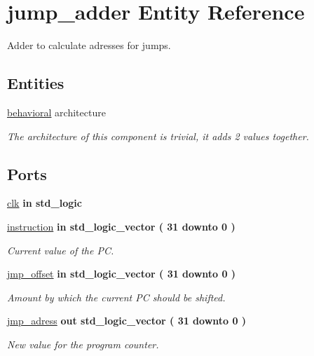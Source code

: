 \hypertarget{classjump__adder}{\section{jump\-\_\-adder \-Entity \-Reference}
\label{classjump__adder}
}


\-Adder to calculate adresses for jumps.  


\subsection*{\-Entities}
\begin{DoxyCompactItemize}
\item 
\hyperlink{classjump__adder_1_1behavioral}{behavioral} architecture
\begin{DoxyCompactList}\small\item\em \-The architecture of this component is trivial, it adds 2 values together. \end{DoxyCompactList}\end{DoxyCompactItemize}
\*
\*
\subsection*{\-Ports}
 \begin{DoxyCompactItemize}
\item 
\hyperlink{classjump__adder_af860a3a86b5cfd289a189d1220f4648d}{clk}  {\bfseries {\bfseries in }} {\bfseries std\-\_\-logic } 
\item 
\hyperlink{classjump__adder_a298266092b29f7f7afb088eecb4e46c1}{instruction}  {\bfseries {\bfseries in }} {\bfseries std\-\_\-logic\-\_\-vector (   31    downto    0  ) } 
\begin{DoxyCompactList}\small\item\em \-Current value of the \-P\-C. \end{DoxyCompactList}\item 
\hyperlink{classjump__adder_a83702b6a2e8dc32a0ac5cfe7e8cafd61}{jmp\-\_\-offset}  {\bfseries {\bfseries in }} {\bfseries std\-\_\-logic\-\_\-vector (   31    downto    0  ) } 
\begin{DoxyCompactList}\small\item\em \-Amount by which the current \-P\-C should be shifted. \end{DoxyCompactList}\item 
\hyperlink{classjump__adder_ad176de343f2a06617f92deabbbbf6256}{jmp\-\_\-adress}  {\bfseries {\bfseries out }} {\bfseries std\-\_\-logic\-\_\-vector (   31    downto    0  ) } 
\begin{DoxyCompactList}\small\item\em \-New value for the program counter. \end{DoxyCompactList}\end{DoxyCompactItemize}


